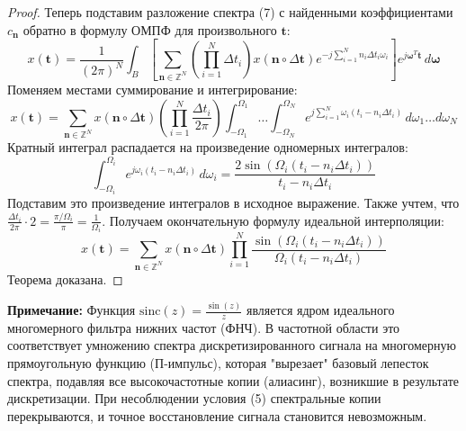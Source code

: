 \documentclass[12pt,a4paper]{article}
\newcommand{\vect}[1]{\mathbf{#1}}
\begin{document}
\begin{proof}
Теперь подставим разложение спектра (7) с найденными коэффициентами $c_{\vect{n}}$ обратно в формулу ОМПФ для произвольного $\vect{t}$:
$$ x(\vect{t}) = \frac{1}{(2\pi)^N} \int_{B} \left[ \sum_{\vect{n} \in \mathbb{Z}^N} \left( \prod_{i=1}^N \Delta t_i \right) x(\vect{n} \circ \Delta \vect{t}) e^{-j \sum_{i=1}^N n_i \Delta t_i \omega_i} \right] e^{j \vect{\omega}^T \vect{t}} \, d\vect{\omega} $$
Поменяем местами суммирование и интегрирование:
$$ x(\vect{t}) = \sum_{\vect{n} \in \mathbb{Z}^N} x(\vect{n} \circ \Delta \vect{t}) \left( \prod_{i=1}^N \frac{\Delta t_i}{2\pi} \right) \int_{-\Omega_1}^{\Omega_1} \dots \int_{-\Omega_N}^{\Omega_N} e^{j \sum_{i=1}^N \omega_i (t_i - n_i \Delta t_i)} \, d\omega_1 \dots d\omega_N $$
Кратный интеграл распадается на произведение одномерных интегралов:
$$ \int_{-\Omega_i}^{\Omega_i} e^{j \omega_i (t_i - n_i \Delta t_i)} \, d\omega_i = \frac{2 \sin(\Omega_i (t_i - n_i \Delta t_i))}{t_i - n_i \Delta t_i} $$
Подставим это произведение интегралов в исходное выражение. Также учтем, что $\frac{\Delta t_i}{2\pi} \cdot 2 = \frac{\pi / \Omega_i}{\pi} = \frac{1}{\Omega_i}$.
Получаем окончательную формулу идеальной интерполяции:
$$ x(\vect{t}) = \sum_{\vect{n} \in \mathbb{Z}^N} x(\vect{n} \circ \Delta \vect{t}) \prod_{i=1}^N \frac{\sin(\Omega_i (t_i - n_i \Delta t_i))}{\Omega_i (t_i - n_i \Delta t_i)} $$
Теорема доказана.
\end{proof}

\textbf{Примечание:} Функция $ \text{sinc}(z) = \frac{\sin(z)}{z} $ является ядром идеального многомерного фильтра нижних частот (ФНЧ). В частотной области это соответствует умножению спектра дискретизированного сигнала на многомерную прямоугольную функцию (П-импульс), которая "вырезает" базовый лепесток спектра, подавляя все высокочастотные копии (алиасинг), возникшие в результате дискретизации. При несоблюдении условия (5) спектральные копии перекрываются, и точное восстановление сигнала становится невозможным.
\end{document}

